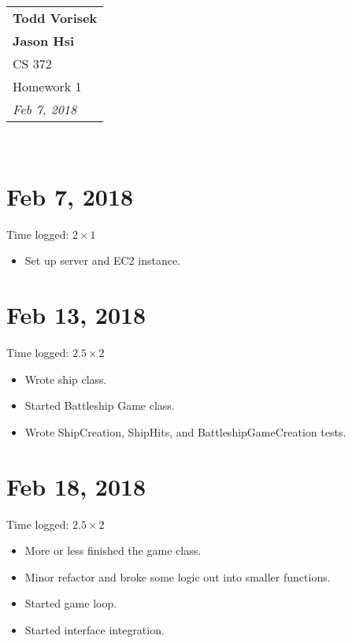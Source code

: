 \documentclass{article}
\begin{document}
  \null\hfill
  \begin{tabular}[t]{l@{}}
    \textbf{Todd Vorisek}\\
    \textbf{Jason Hsi} \\
    CS 372 \\
    Homework 1\\
    \textit{Feb 7, 2018} \\
  \end{tabular}\\

  \section*{Feb 7, 2018}
    Time logged: $2 \times 1 $
    \begin{itemize}
      \item Set up server and EC2 instance.
    \end{itemize}

  \section*{Feb 13, 2018}
    Time logged: $2.5 \times 2 $
    \begin{itemize}
      \item Wrote ship class. 
      \item Started Battleship Game class. 
      \item Wrote ShipCreation, ShipHits, and BattleshipGameCreation tests.
    \end{itemize}

  \section*{Feb 18, 2018}
    Time logged: $2.5 \times 2 $
    \begin{itemize}
      \item More or less finished the game class.
      \item Minor refactor and broke some logic out into smaller functions.
      \item Started game loop.
      \item Started interface integration.
    \end{itemize}
\end{document}
